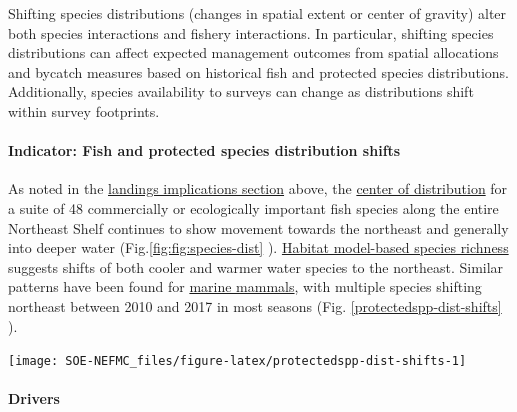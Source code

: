 \documentclass[
  10pt,
]{article}
\let\origfigure\figure
\let\endorigfigure\endfigure
\renewenvironment{figure}[1][2] {
    \expandafter\origfigure\expandafter[H]
} {
    \endorigfigure
}
\begin{document}
Shifting species distributions (changes in spatial extent or center of gravity) alter both species interactions and fishery interactions. In particular, shifting species distributions can affect expected management outcomes from spatial allocations and bycatch measures based on historical fish and protected species distributions. Additionally, species availability to surveys can change as distributions shift within survey footprints.

\hypertarget{indicator-fish-and-protected-species-distribution-shifts}{%
\paragraph{Indicator: Fish and protected species distribution shifts}\label{indicator-fish-and-protected-species-distribution-shifts}}

As noted in the \protect\hyperlink{implications}{landings implications section} above, the \href{https://noaa-edab.github.io/catalog/species-distribution-indicators.html}{center of distribution} for a suite of 48 commercially or ecologically important fish species along the entire Northeast Shelf continues to show movement towards the northeast and generally into deeper water (Fig.\ref{fig:fig:species-dist} ). \href{https://noaa-edab.github.io/catalog/species-richness.html}{Habitat model-based species richness} suggests shifts of both cooler and warmer water species to the northeast. Similar patterns have been found for \href{https://noaa-edab.github.io/catalog/cetacean-distribution-shifts.html}{marine mammals}, with multiple species shifting northeast between 2010 and 2017 in most seasons (Fig. \ref{protectedspp-dist-shifts} ).

\begin{figure}

{\centering \texttt{[image: SOE-NEFMC\_files/figure-latex/protectedspp-dist-shifts-1]} 

}

\caption{Direction and magnitude of core habitat shifts, represented by the length of the line of the seasonal weighted centroid for species with more than 70 km difference between 2010 and 2017 (tip of arrow).}\label{fig:protectedspp-dist-shifts}
\end{figure}

\hypertarget{drivers}{%
\paragraph{Drivers}\label{drivers}}
\end{document}
